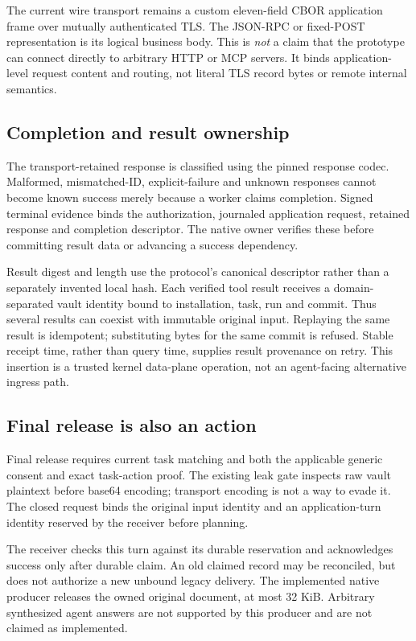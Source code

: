 \documentclass[letterpaper,twocolumn,10pt]{article}
\begin{document}
The current wire transport remains a custom eleven-field CBOR application
frame over mutually authenticated TLS. The JSON-RPC or fixed-POST representation
is its logical business body. This is \emph{not} a claim that the prototype can
connect directly to arbitrary HTTP or MCP servers. It binds application-level
request content and routing, not literal TLS record bytes or remote internal
semantics.

\subsection{Completion and result ownership}

The transport-retained response is classified using the pinned response codec.
Malformed, mismatched-ID, explicit-failure and unknown responses cannot become
known success merely because a worker claims completion. Signed terminal
evidence binds the authorization, journaled application request, retained response
and completion descriptor. The native owner verifies these before committing
result data or advancing a success dependency.

Result digest and length use the protocol's canonical descriptor rather than a
separately invented local hash. Each verified tool result receives a
domain-separated vault identity bound to installation, task, run and commit.
Thus several results can coexist with immutable original input. Replaying the
same result is idempotent; substituting bytes for the same commit is refused.
Stable receipt time, rather than query time, supplies result provenance on retry.
This insertion is a trusted kernel data-plane operation, not an agent-facing
alternative ingress path.

\subsection{Final release is also an action}

Final release requires current task matching and both the applicable generic
consent and exact task-action proof. The existing leak gate inspects raw vault
plaintext before base64 encoding; transport encoding is not a way to evade it.
The closed request binds the original input identity and an application-turn
identity reserved by the receiver before planning.

The receiver checks this turn against its durable reservation and acknowledges
success only after durable claim. An old claimed record may be reconciled, but
does not authorize a new unbound legacy delivery. The implemented native producer
releases the owned original document, at most 32 KiB. Arbitrary synthesized agent
answers are not supported by this producer and are not claimed as implemented.
\end{document}
